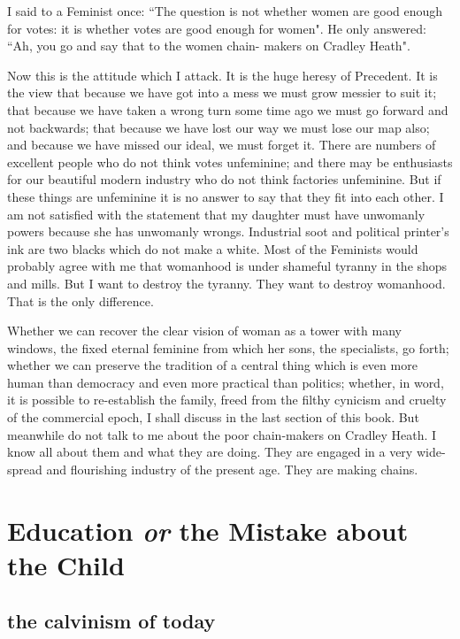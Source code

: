 \documentclass[final,10pt,letterpaper,twocolumn,openany]{book}
\begin{document}
 I said to a Feminist once: ``The question is not whether women
are good enough for votes: it is whether votes are good enough for
women". He only answered: ``Ah, you go and say that to the women chain-
makers on Cradley Heath".

Now this is the attitude which I attack. It is the huge heresy of
Precedent. It is the view that because we have got into a mess we must
grow messier to suit it; that because we have taken a wrong turn some
time ago we must go forward and not backwards; that because we have
lost our way we must lose our map also; and because we have missed our
ideal, we must forget it. There are numbers of excellent people who do
not think votes unfeminine; and there may be enthusiasts for our beautiful
modern industry who do not think factories unfeminine. But if these things
are unfeminine it is no answer to say that they fit into each other. I am not
satisfied with the statement that my daughter must have unwomanly
powers because she has unwomanly wrongs. Industrial soot and political
printer's ink are two blacks which do not make a white. Most of the
Feminists would probably agree with me that womanhood is under
shameful tyranny in the shops and mills. But I want to destroy the tyranny.
They want to destroy womanhood. That is the only difference.

Whether we can recover the clear vision of woman as a tower with
many windows, the fixed eternal feminine from which her sons, the
specialists, go forth; whether we can preserve the tradition of a central
thing which is even more human than democracy and even more practical
than politics; whether, in word, it is possible to re-establish the family,
freed from the filthy cynicism and cruelty of the commercial epoch, I shall
discuss in the last section of this book. But meanwhile do not talk to me
about the poor chain-makers on Cradley Heath. I know all about them and
what they are doing. They are engaged in a very wide-spread and
flourishing industry of the present age. They are making chains.

\chapter{ Education \textit{or} the Mistake about the Child }

\section{the calvinism of today}
\end{document}
